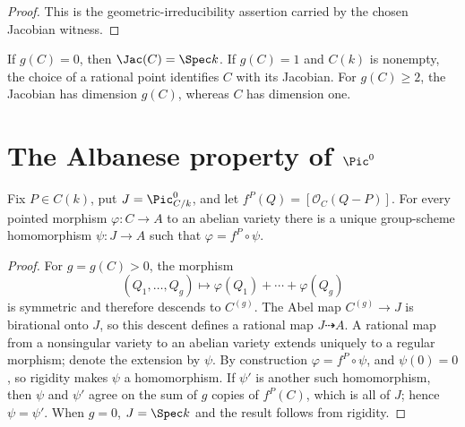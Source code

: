 \begin{proof}
  This is the geometric-irreducibility assertion carried by the chosen
  Jacobian witness.
\end{proof}

\begin{remark}
  If \(g(C)=0\), then \(\Jac(C)=\Spec k\).  If \(g(C)=1\) and \(C(k)\) is
  nonempty, the choice of a rational point identifies \(C\) with its
  Jacobian.  For \(g(C)\geq2\), the Jacobian has dimension \(g(C)\), whereas
  \(C\) has dimension one.
\end{remark}

\section{The Albanese property of \(\Pic^0\)}
\label{sec:Jacobian_routeA4_albaneseUP}

\begin{theorem}
  \label{thm:albanese_universal_property_northstar}
  Fix \(P\in C(k)\), put \(J=\Pic^0_{C/k}\), and let
  \(f^P(Q)=[\mathcal O_C(Q-P)]\).  For every pointed morphism
  \(\varphi\colon C\to A\) to an abelian variety there is a unique
  group-scheme homomorphism \(\psi\colon J\to A\) such that
  \(\varphi=f^P\circ\psi\).
\end{theorem}

\begin{proof}
  For \(g=g(C)>0\), the morphism
  \[
    (Q_1,\ldots,Q_g)\longmapsto
      \varphi(Q_1)+\cdots+\varphi(Q_g)
  \]
  is symmetric and therefore descends to \(C^{(g)}\).  The Abel map
  \(C^{(g)}\to J\) is birational onto \(J\), so this descent defines a
  rational map \(J\dashrightarrow A\).  A rational map from a nonsingular
  variety to an abelian variety extends uniquely to a regular morphism;
  denote the extension by \(\psi\).  By construction
  \(\varphi=f^P\circ\psi\), and \(\psi(0)=0\), so rigidity makes \(\psi\) a
  homomorphism.  If \(\psi'\) is another such homomorphism, then \(\psi\) and
  \(\psi'\) agree on the sum of \(g\) copies of \(f^P(C)\), which is all of
  \(J\); hence \(\psi=\psi'\).  When \(g=0\), \(J=\Spec k\) and the result
  follows from rigidity.
\end{proof}
